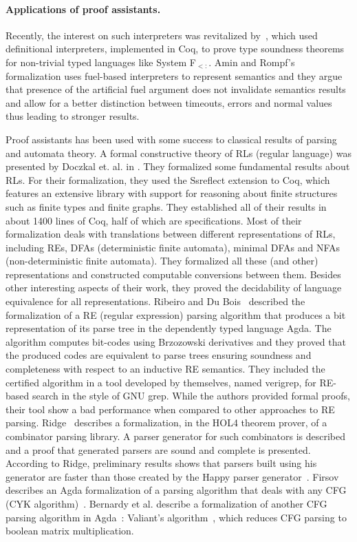 \paragraph{Applications of proof assistants.}


Recently, the interest on such interpreters was revitalized by~\citet{Amin17}, which used definitional
interpreters, implemented in Coq, to prove type soundness theorems for non-trivial typed languages like System F$_{<:}$.
Amin and Rompf's formalization uses fuel-based interpreters to represent semantics and they argue that presence of
the artificial fuel argument does not invalidate semantics results and allow for a better distinction between timeouts,
errors and normal values thus leading to stronger results.


Proof assistants has been used with some success to classical results of parsing and automata theory.
A formal constructive theory of RLs (regular language) was presented by Doczkal et. al. in
\cite{Doczkal13}. They formalized some fundamental results about RLs.
For their formalization, they used the Ssreflect extension to Coq, which
features an extensive library with support for reasoning about finite
structures such as finite types and finite graphs. They established all
of their results in about 1400 lines of Coq, half of which are specifications.
Most of their formalization deals with translations between different
representations of RLs, including REs, DFAs (deterministic finite automata),
minimal DFAs and NFAs (non-deterministic finite automata).
They formalized all these (and other) representations and constructed
computable conversions between them. Besides other interesting aspects
of their work, they proved the decidability of language equivalence
for all representations. Ribeiro and Du Bois~\cite{Ribeiro17} described the formalization of a RE
(regular expression) parsing algorithm that produces a bit representation
of its parse tree in the dependently typed language Agda. The algorithm computes bit-codes using Brzozowski derivatives and
they proved that the produced codes are equivalent to parse trees ensuring soundness and completeness with respect to an
inductive RE semantics. They included the certified algorithm in a tool developed by themselves, named verigrep, for RE-based
search in the style of GNU grep. While the authors provided formal proofs, their tool show a bad performance when compared to
other approaches to RE parsing. Ridge~\cite{Ridge2011} describes a formalization, in the HOL4 theorem
prover, of a combinator parsing library. A parser generator for such
combinators is described and a proof that generated parsers are sound
and complete is presented.  According to Ridge, preliminary results
shows that parsers built using his generator are faster than those
created by the Happy parser generator~\cite{Happy}.
Firsov describes an Agda formalization of a parsing algorithm that
deals with any CFG (CYK algorithm)~\cite{Firsov2014}. Bernardy
et al. describe a formalization of another CFG parsing algorithm in
Agda~\cite{BernardyJ16}: Valiant's algorithm~\cite{Valiant1975}, which
reduces CFG parsing to boolean matrix multiplication. 


